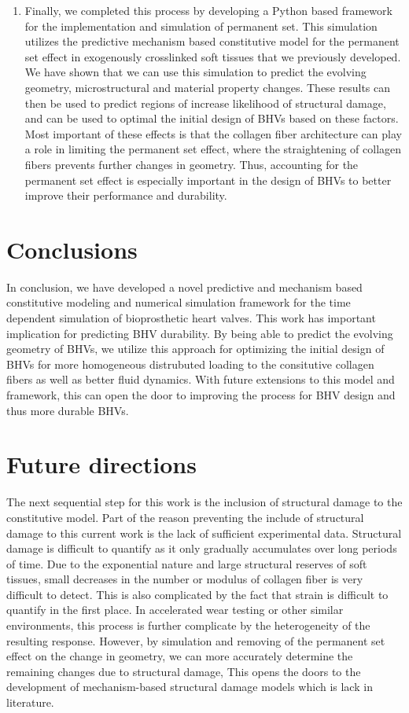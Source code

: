 \begin{enumerate}
        \item Finally, we completed this process by developing a Python based framework for the implementation and simulation of permanent set. This simulation utilizes the predictive mechanism based constitutive model for the permanent set effect in exogenously crosslinked soft tissues that we previously developed. We have shown that we can use this simulation to predict the evolving geometry, microstructural and material property changes. These results can then be used to predict regions of increase likelihood of structural damage, and can be used to optimal the initial design of BHVs based on these factors. Most important of these effects is that the collagen fiber architecture can play a role in limiting the permanent set effect, where the straightening of collagen fibers prevents further changes in geometry. Thus, accounting for the permanent set effect is especially important in the design of BHVs to better improve their performance and durability. 
    \end{enumerate}
    
\section{Conclusions}

    In conclusion, we have developed a novel predictive and mechanism based constitutive modeling and numerical simulation framework for the time dependent simulation of bioprosthetic heart valves. This work has important implication for predicting BHV durability. By being able to predict the evolving geometry of BHVs, we utilize this approach for optimizing the initial design of BHVs for more homogeneous distrubuted loading to the consitutive collagen fibers as well as better fluid dynamics. With future extensions to this model and framework, this can open the door to improving the process for BHV design and thus more durable BHVs. 

\section{Future directions}
    
    The next sequential step for this work is the inclusion of structural damage to the constitutive model. Part of the reason preventing the include of structural damage to this current work is the lack of sufficient experimental data. Structural damage is difficult to quantify as it only gradually accumulates over long periods of time. Due to the exponential nature and large structural reserves of soft tissues, small decreases in the number or modulus of collagen fiber is very difficult to detect. This is also complicated by the fact that strain is difficult to quantify in the first place. In accelerated wear testing or other similar environments, this process is further complicate by the heterogeneity of the resulting response. However, by simulation and removing of the permanent set effect on the change in geometry, we can more accurately determine the remaining changes due to structural damage, This opens the doors to the development of mechanism-based structural damage models which is lack in literature. 
    
